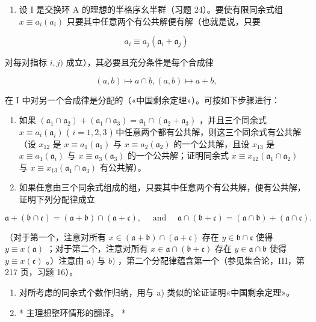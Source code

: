 \begin{enumerate}
\def\labelenumi{\arabic{enumi})}
\setcounter{enumi}{24}
\tightlist
\item
  设 I 是交换环 A 的理想的半格序幺半群（习题 24）。要使有限同余式组 \(x \equiv a_i(a_i)\) 只要其中任意两个有公共解便有解（也就是说，只要
\end{enumerate}

\[
a _ {i} \equiv a _ {j} (\mathfrak {a} _ {i} + \mathfrak {a} _ {j})
\]

对每对指标 \(i, j)\) 成立），其必要且充分条件是每个合成律

\[
(a, b) \mapsto a \cap b, (a, b) \mapsto a + b,
\]

在 I 中对另一个合成律是分配的（«中国剩余定理»）。可按如下步骤进行：

\begin{enumerate}
\def\labelenumi{\alph{enumi})}
\item
  如果 \((\mathfrak{a}_1 \cap \mathfrak{a}_2) + (\mathfrak{a}_1 \cap \mathfrak{a}_3) = \mathfrak{a}_1 \cap (\mathfrak{a}_2 + \mathfrak{a}_3)\) ，并且三个同余式 \(x \equiv a_i(\mathfrak{a}_i)\) ( \(i = 1, 2, 3\) ) 中任意两个都有公共解，则这三个同余式有公共解（设 \(x_{12}\) 是 \(x \equiv a_1(\mathfrak{a}_1)\) 与 \(x \equiv a_2(\mathfrak{a}_2)\) 的一个公共解，且设 \(x_{13}\) 是 \(x \equiv a_1(\mathfrak{a}_i)\) 与 \(x \equiv a_3(\mathfrak{a}_3)\) 的一个公共解；证明同余式 \(x \equiv x_{12}(\mathfrak{a}_1 \cap \mathfrak{a}_2)\) 与 \(x \equiv x_{13}(\mathfrak{a}_1 \cap \mathfrak{a}_3)\) 有公共解）。
\item
  如果任意由三个同余式组成的组，只要其中任意两个有公共解，便有公共解，证明下列分配律成立
\end{enumerate}

\[
\mathfrak {a} + (\mathfrak {b} \cap \mathfrak {c}) = (\mathfrak {a} + \mathfrak {b}) \cap (\mathfrak {a} + \mathfrak {c}), \quad \text { and } \quad \mathfrak {a} \cap (\mathfrak {b} + \mathfrak {c}) = (\mathfrak {a} \cap \mathfrak {b}) + (\mathfrak {a} \cap \mathfrak {c}).
\]

（对于第一个，注意对所有 \(x \in (\mathfrak{a} + \mathfrak{b}) \cap (\mathfrak{a} + \mathfrak{c})\) 存在 \(y \in \mathfrak{b} \cap \mathfrak{c}\) 使得 \(y \equiv x(\mathfrak{a})\) ；对于第二个，注意对所有 \(x \in \mathfrak{a} \cap (\mathfrak{b} + \mathfrak{c})\) 存在 \(y \in \mathfrak{a} \cap \mathfrak{b}\) 使得 \(y \equiv x(\mathfrak{c})\) 。）注意由 \(a)\) 与 \(b)\) ，第二个分配律蕴含第一个（参见集合论，III，第 217 页，习题 16）。

\begin{enumerate}
\def\labelenumi{\alph{enumi})}
\setcounter{enumi}{2}
\item
  对所考虑的同余式个数作归纳，用与 a) 类似的论证证明«中国剩余定理»。
\item
  * 主理想整环情形的翻译。 *
\end{enumerate}

